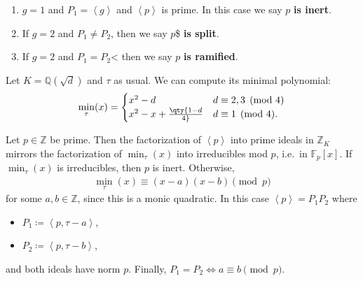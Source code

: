 \begin{enumerate}
\def\labelenumi{\alph{enumi}.}
\item
  \(g=1\) and \(P_1 = \left\langle{ g }\right\rangle\) and
  \(\left\langle{ p }\right\rangle\) is prime. In this case we say \(p\)
  \textbf{is inert}.
\item
  If \(g=2\) and \(P_1 \neq P_2\), then we say \(p\)\$ \textbf{is
  split}.
\item
  If \(g=2\) and \(P_1 = P_2\)\textless{} then we say \(p\) \textbf{is
  ramified}.
\end{enumerate}

Let \(K = {\mathbb{Q}}( \sqrt{d} )\) and \(\tau\) as usual. We can
compute its minimal polynomial:
\begin{align*}
\min_\tau(x) = 
\begin{cases}
x^2 - d & d \equiv 2,3 \pmod 4  
\\
x^2 - x + \qty{1-d \over 4} & d \equiv 1 \pmod 4.
\end{cases}
\end{align*}

\begin{theorem}

Let \(p\in {\mathbb{Z}}\) be prime. Then the factorization of
\(\left\langle{ p }\right\rangle\) into prime ideals in
\({\mathbb{Z}}_K\) mirrors the factorization of \(\min_\tau(x)\) into
irreducibles mod \(p\), i.e.~in \({\mathbb{F}}_p[x]\). If
\(\min_\tau(x)\) is irreducibles, then \(p\) is inert. Otherwise,
\begin{align*}
\min_\tau(x) \equiv (x-a)(x-b) \pmod p
\end{align*}
for some \(a, b\in {\mathbb{Z}}\), since this is a monic quadratic. In
this case \(\left\langle{ p }\right\rangle= P_1 P_2\) where

\begin{itemize}
\tightlist
\item
  \(P_1 \coloneqq\left\langle{ p, \tau - a }\right\rangle\),
\item
  \(P_2 \coloneqq\left\langle{ p, \tau - b}\right\rangle\),
\end{itemize}

and both ideals have norm \(p\). Finally,
\(P_1 = P_2 \iff a\equiv b \pmod p\).

\end{theorem}

